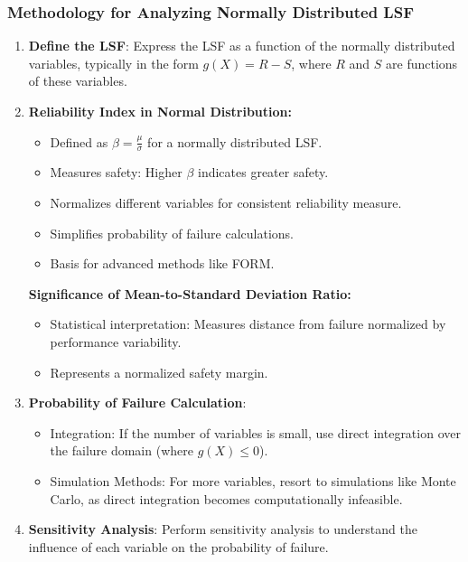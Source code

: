 \subsubsection*{Methodology for Analyzing Normally Distributed LSF}
\begin{enumerate}
    \item \textbf{Define the LSF}: Express the LSF as a function of the normally distributed variables, typically in the form \( g(X) = R - S \), where \( R \) and \( S \) are functions of these variables.
    \item \textbf{Reliability Index in Normal Distribution:}
\begin{itemize}
    \item Defined as \( \beta = \frac{\mu}{\sigma} \) for a normally distributed LSF.
    \item Measures safety: Higher $\beta$  indicates greater safety.
    \item Normalizes different variables for consistent reliability measure.
    \item Simplifies probability of failure calculations.
    \item Basis for advanced methods like FORM.
\end{itemize}

\textbf{Significance of Mean-to-Standard Deviation Ratio:}
\begin{itemize}
    \item Statistical interpretation: Measures distance from failure normalized by performance variability.
    \item Represents a normalized safety margin.
\end{itemize}
    \item \textbf{Probability of Failure Calculation}:
        \begin{itemize}
            \item \textbfDirect Integration: If the number of variables is small, use direct integration over the failure domain (where \( g(X) \leq 0 \)).
            \item Simulation Methods: For more variables, resort to simulations like Monte Carlo, as direct integration becomes computationally infeasible.
        \end{itemize}
    \item \textbf{Sensitivity Analysis}: Perform sensitivity analysis to understand the influence of each variable on the probability of failure.
\end{enumerate}

